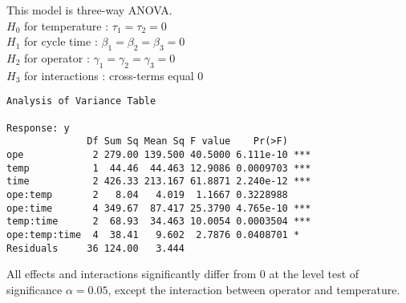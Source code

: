 \documentclass{article}
\begin{document}
 
 This model is three-way ANOVA. \\
$H_0$ for temperature : $ \tau_1 = \tau_2 =0$\\
$H_1$ for cycle time : $ \beta_1 = \beta_2=\beta_3=0$\\
$H_2$ for operator : $ \gamma_1 = \gamma_2=\gamma_3=0$\\
$H_3$ for interactions : cross-terms equal 0
\begin{verbatim}
Analysis of Variance Table

Response: y
              Df Sum Sq Mean Sq F value    Pr(>F)    
ope            2 279.00 139.500 40.5000 6.111e-10 ***
temp           1  44.46  44.463 12.9086 0.0009703 ***
time           2 426.33 213.167 61.8871 2.240e-12 ***
ope:temp       2   8.04   4.019  1.1667 0.3228988    
ope:time       4 349.67  87.417 25.3790 4.765e-10 ***
temp:time      2  68.93  34.463 10.0054 0.0003504 ***
ope:temp:time  4  38.41   9.602  2.7876 0.0408701 *  
Residuals     36 124.00   3.444                          
\end{verbatim}
All effects and interactions significantly differ from 0 at the level test of significance $\alpha=0.05$, except the interaction between operator and temperature.\\
\end{document}

